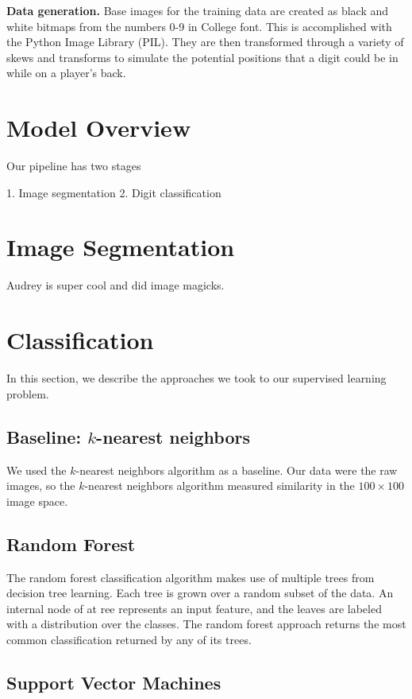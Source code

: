 \documentclass[a4paper]{article}
\begin{document}
{\bf Data generation.} Base images for the training data are created as black and white bitmaps from the numbers 0-9 in College font. This is accomplished with the Python Image Library (PIL). They are then transformed through a variety of skews and transforms to simulate the potential positions that a digit could be in while on a player's back. \\

\section{Model Overview}

Our pipeline has two stages

1. Image segmentation
2. Digit classification

\section{Image Segmentation}

Audrey is super cool and did image magicks.

\section{Classification}

In this section, we describe the approaches we took to our supervised learning problem.

\subsection{Baseline: $k$-nearest neighbors}

We used the $k$-nearest neighbors algorithm as a baseline. Our data were the raw images, so the $k$-nearest neighbors algorithm measured similarity in the $100 \times 100$ image space.

\subsection{Random Forest}

The random forest classification algorithm makes use of multiple trees from decision tree learning. Each tree is grown over a random subset of the data. An internal node of at ree represents an input feature, and the leaves are labeled with a distribution over the classes. The random forest approach returns the most common classification returned by any of its trees. 

\subsection{Support Vector Machines}
\end{document}
